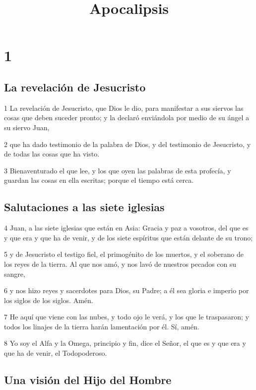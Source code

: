 
\title{Apocalipsis}

\chapter{1}

\section*{La revelación de Jesucristo}

\par 1 La revelación de Jesucristo, que Dios le dio, para manifestar a sus siervos las cosas que deben suceder pronto; y la declaró enviándola por medio de su ángel a su siervo Juan,
\par 2 que ha dado testimonio de la palabra de Dios, y del testimonio de Jesucristo, y de todas las cosas que ha visto.
\par 3 Bienaventurado el que lee, y los que oyen las palabras de esta profecía, y guardan las cosas en ella escritas; porque el tiempo está cerca.

\section*{Salutaciones a las siete iglesias}

\par 4 Juan, a las siete iglesias que están en Asia: Gracia y paz a vosotros, del que es y que era y que ha de venir, y de los siete espíritus que están delante de su trono;
\par 5 y de Jesucristo el testigo fiel, el primogénito de los muertos, y el soberano de los reyes de la tierra. Al que nos amó, y nos lavó de nuestros pecados con su sangre,
\par 6 y nos hizo reyes y sacerdotes para Dios, su Padre; a él sea gloria e imperio por los siglos de los siglos. Amén.
\par 7 He aquí que viene con las nubes, y todo ojo le verá, y los que le traspasaron; y todos los linajes de la tierra harán lamentación por él. Sí, amén.
\par 8 Yo soy el Alfa y la Omega, principio y fin, dice el Señor, el que es y que era y que ha de venir, el Todopoderoso.

\section*{Una visión del Hijo del Hombre}

